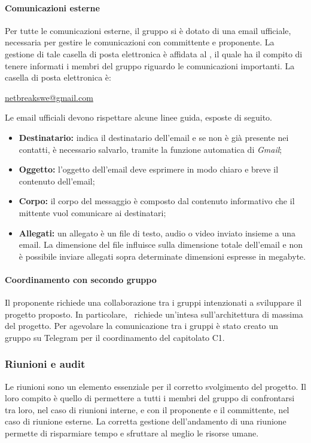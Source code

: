 			\paragraph{Comunicazioni esterne}
			Per tutte le comunicazioni esterne, il gruppo \textit{\gruppo} si è dotato di una email ufficiale, necessaria per gestire le comunicazioni con committente e proponente. La gestione di tale casella di posta elettronica è affidata al \textit{\RdP}, il quale ha il compito di tenere informati i membri del gruppo riguardo le comunicazioni importanti. La casella di posta elettronica è:
			\begin{center}
				\url{netbreakswe@gmail.com} 
			\end{center}
		Le email ufficiali devono rispettare alcune linee guida, esposte di seguito.
		\begin{itemize}
			\item \textbf{Destinatario:} indica il destinatario dell'email e se non è già presente nei contatti, è necessario salvarlo, tramite la funzione automatica di \textit{Gmail};
			\item \textbf{Oggetto:} l'oggetto dell'email deve esprimere in modo chiaro e breve il contenuto dell'email;
			\item \textbf{Corpo:} il corpo del messaggio è composto dal contenuto informativo che il mittente vuol comunicare ai destinatari;
			\item \textbf{Allegati:} un allegato è un file di testo, audio o video inviato insieme a una email. La dimensione del file influisce sulla dimensione totale dell'email e non è possibile inviare allegati sopra determinate dimensioni espresse in megabyte.
		\end{itemize}
		\paragraph{Coordinamento con secondo gruppo}
			Il proponente richiede una collaborazione tra i gruppi intenzionati a sviluppare il progetto proposto. In particolare, \proponente\ richiede un'intesa sull'architettura di massima del progetto. Per agevolare la comunicazione tra i gruppi è stato creato un gruppo su Telegram per il coordinamento del capitolato C1.
			
		\subsubsection{Riunioni e audit}
		Le riunioni sono un elemento essenziale per il corretto svolgimento del progetto. Il loro compito è quello di permettere a tutti i membri del gruppo di confrontarsi tra loro, nel caso di riunioni interne, e con il proponente e il committente, nel caso di riunione esterne. La corretta gestione dell'andamento di una riunione permette di risparmiare tempo e sfruttare al meglio le risorse umane.
		
